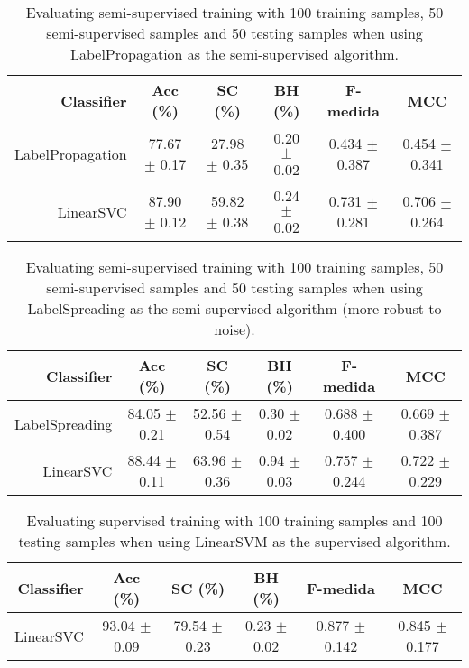 \begin{table}[!htb]
\footnotesize
\centering
\caption{Evaluating semi-supervised training with 100 training samples, 50 semi-supervised samples and 50 testing samples when using LabelPropagation as the semi-supervised algorithm.}
\label{tab:label-propagation-Psy_9bZkp7q19f0}
\begin{tabular}{r|c|c|c|c|c}
\hline\hline
Classifier & Acc (\%) & SC (\%) & BH (\%) & F-medida & MCC \\ \hline
LabelPropagation & 77.67 $\pm$ 0.17 & 27.98 $\pm$ 0.35 & 0.20 $\pm$ 0.02 & 0.434 $\pm$ 0.387 & 0.454 $\pm$ 0.341 \\
LinearSVC & 87.90 $\pm$ 0.12 & 59.82 $\pm$ 0.38 & 0.24 $\pm$ 0.02 & 0.731 $\pm$ 0.281 & 0.706 $\pm$ 0.264 \\
\hline\hline
\end{tabular}
\end{table}
\begin{table}[!htb]
\footnotesize
\centering
\caption{Evaluating semi-supervised training with 100 training samples, 50 semi-supervised samples and 50 testing samples when using LabelSpreading as the semi-supervised algorithm (more robust to noise).}
\label{tab:label-spreading-Psy_9bZkp7q19f0}
\begin{tabular}{r|c|c|c|c|c}
\hline\hline
Classifier & Acc (\%) & SC (\%) & BH (\%) & F-medida & MCC \\ \hline
LabelSpreading & 84.05 $\pm$ 0.21 & 52.56 $\pm$ 0.54 & 0.30 $\pm$ 0.02 & 0.688 $\pm$ 0.400 & 0.669 $\pm$ 0.387 \\
LinearSVC & 88.44 $\pm$ 0.11 & 63.96 $\pm$ 0.36 & 0.94 $\pm$ 0.03 & 0.757 $\pm$ 0.244 & 0.722 $\pm$ 0.229 \\
\hline\hline
\end{tabular}
\end{table}
\begin{table}[!htb]
\footnotesize
\centering
\caption{Evaluating supervised training with 100 training samples and 100 testing samples when using LinearSVM as the supervised algorithm.}
\label{tab:linear-svm-Psy_9bZkp7q19f0}
\begin{tabular}{r|c|c|c|c|c}
\hline\hline
Classifier & Acc (\%) & SC (\%) & BH (\%) & F-medida & MCC \\ \hline
LinearSVC & 93.04 $\pm$ 0.09 & 79.54 $\pm$ 0.23 & 0.23 $\pm$ 0.02 & 0.877 $\pm$ 0.142 & 0.845 $\pm$ 0.177 \\
\hline\hline
\end{tabular}
\end{table}

